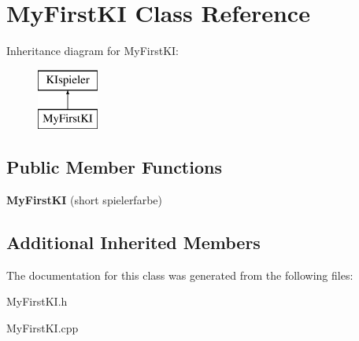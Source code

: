 \hypertarget{class_my_first_k_i}{\section{My\-First\-K\-I Class Reference}
\label{class_my_first_k_i}
}
Inheritance diagram for My\-First\-K\-I\-:\begin{figure}[H]
\begin{center}
\leavevmode
\includegraphics[height=2.000000cm]{class_my_first_k_i}
\end{center}
\end{figure}
\subsection*{Public Member Functions}
\begin{DoxyCompactItemize}
\item 
\hypertarget{class_my_first_k_i_ac75297663481129c68bfd32adcbc3192}{{\bfseries My\-First\-K\-I} (short spielerfarbe)}\label{class_my_first_k_i_ac75297663481129c68bfd32adcbc3192}

\end{DoxyCompactItemize}
\subsection*{Additional Inherited Members}


The documentation for this class was generated from the following files\-:\begin{DoxyCompactItemize}
\item 
My\-First\-K\-I.\-h\item 
My\-First\-K\-I.\-cpp\end{DoxyCompactItemize}
